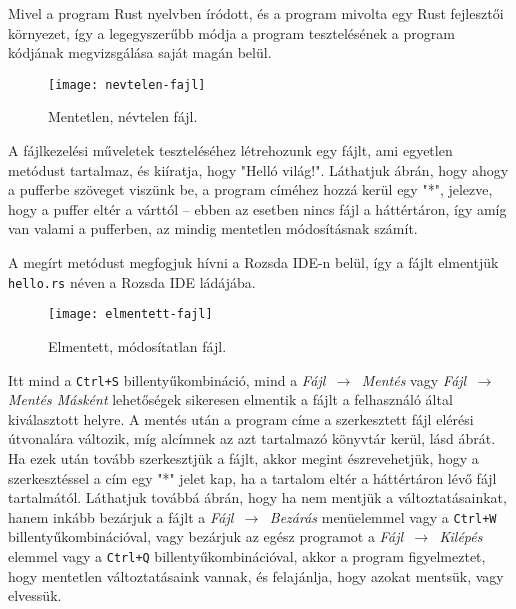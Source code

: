 

Mivel a program Rust nyelvben íródott, és a program mivolta egy Rust fejlesztői környezet,
így a legegyszerűbb módja a program tesztelésének a program kódjának megvizsgálása saját magán belül.


\begin{figure}[h]
    \centering
    \texttt{[image: nevtelen-fajl]}
    \caption{Mentetlen, névtelen fájl.}
    \label{fig:nevtelen-fajl}
\end{figure}

A fájlkezelési műveletek teszteléséhez létrehozunk egy fájlt, ami egyetlen metódust tartalmaz,
és kiíratja, hogy "Helló világ!". 
Láthatjuk  ábrán, hogy ahogy a pufferbe szöveget viszünk be, a program címéhez hozzá kerül egy "*",
jelezve, hogy a puffer eltér a várttól -- ebben az esetben nincs fájl a háttértáron,
így amíg van valami a pufferben, az mindig mentetlen módosításnak számít.

A megírt metódust megfogjuk hívni a Rozsda IDE-n belül, így a fájlt elmentjük \texttt{hello.rs}
néven a Rozsda IDE ládájába.


\begin{figure}[h]
    \centering
    \texttt{[image: elmentett-fajl]}
    \caption{Elmentett, módosítatlan fájl.}
    \label{fig:elmentett-fajl}
\end{figure}

Itt mind a \texttt{Ctrl+S} billentyűkombináció, mind a \textit{Fájl $\,\to\,$ Mentés} vagy \textit{Fájl $\,\to\,$ Mentés Másként}
lehetőségek sikeresen elmentik a fájlt a felhasználó által kiválasztott helyre.
A mentés után a program címe a szerkesztett fájl elérési útvonalára változik,
míg alcímnek az azt tartalmazó könyvtár kerül, lásd  ábrát.
Ha ezek után tovább szerkesztjük a fájlt, akkor megint észrevehetjük,
hogy a szerkesztéssel a cím egy "*" jelet kap, ha a tartalom eltér a háttértáron lévő fájl tartalmától.
Láthatjuk továbbá   ábrán, hogy ha nem mentjük a változtatásainkat, 
hanem inkább bezárjuk a fájlt a \textit{Fájl $\,\to\,$ Bezárás} menüelemmel vagy a \texttt{Ctrl+W} billentyűkombinációval,
vagy bezárjuk az egész programot a \textit{Fájl $\,\to\,$ Kilépés} elemmel vagy a \texttt{Ctrl+Q} billentyűkombinációval,
akkor a program figyelmeztet, hogy mentetlen változtatásaink vannak,
és felajánlja, hogy azokat mentsük, vagy elvessük.

